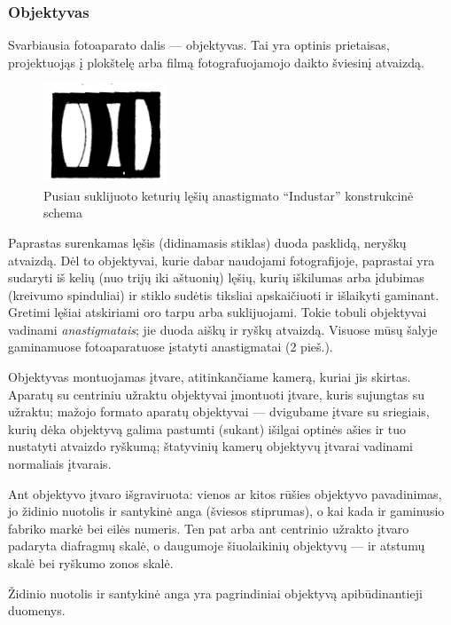 \documentclass{book}
\begin{document}
				\subsubsection*{Objektyvas}
					Svarbiausia fotoaparato dalis --- objektyvas. Tai yra optinis prietaisas, projektuojąs į plokštelę arba filmą fotografuojamojo daikto šviesinį atvaizdą.
					\begin{figure}
						\centering
						\includegraphics[width=0.33\textwidth]{2-pav}
						\caption{Pusiau suklijuoto keturių lęšių anastigmato ``Industar'' konstrukcinė schema}
						\label{fig:2}
					\end{figure}
					Paprastas surenkamas lęšis (didinamasis stiklas) duoda pasklidą, neryškų atvaizdą. Dėl to objektyvai, kurie dabar naudojami fotografijoje, paprastai yra sudaryti iš kelių (nuo trijų iki aštuonių) lęšių, kurių iškilumas arba įdubimas (kreivumo spinduliai) ir stiklo sudėtis tiksliai apskaičiuoti ir išlaikyti gaminant. Gretimi lęšiai atskiriami oro tarpu arba suklijuojami. Tokie tobuli objektyvai vadinami \textit{anastigmatais}; jie duoda aiškų ir ryškų atvaizdą. Visuose mūsų šalyje gaminamuose fotoaparatuose įstatyti anastigmatai (2 pieš.).

					Objektyvas montuojamas įtvare, atitinkančiame kamerą, kuriai jis skirtas. Aparatų su centriniu užraktu objektyvai įmontuoti įtvare, kuris sujungtas su užraktu; mažojo formato aparatų objektyvai --- dvigubame įtvare su sriegiais, kurių dėka objektyvą galima pastumti (sukant) išilgai optinės ašies ir tuo nustatyti atvaizdo ryškumą; štatyvinių kamerų objektyvų įtvarai vadinami normaliais įtvarais.

					Ant objektyvo įtvaro išgraviruota: vienos ar kitos rūšies objektyvo pavadinimas, jo židinio nuotolis ir santykinė anga (šviesos stiprumas), o kai kada ir gaminusio fabriko markė bei eilės numeris. Ten pat arba ant centrinio užrakto įtvaro padaryta diafragmų skalė, o daugumoje šiuolaikinių objektyvų --- ir atstumų skalė bei ryškumo zonos skalė.

					Židinio nuotolis ir santykinė anga yra pagrindiniai objektyvą apibūdinantieji duomenys.\\
				
\end{document}
